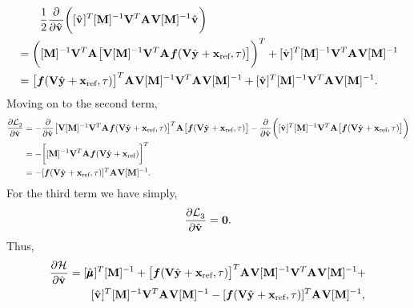 \documentclass[3p,computermodern,10pt]{elsarticle}
\begin{document}
\begin{appendices}
\begin{align*}
& \qquad \frac{1}{2} \frac{\partial }{\partial \hat{\mathbf{v}}^{}{}} \bigg( [\hat{\mathbf{v}}^{}]^T [\mathbf{M}]^{-1} \mathbf {V}^T \mathbf{A}^{} \mathbf {V} [\mathbf{M}]^{-1} \hat{\mathbf{v}}^{}\bigg) \\
&= \bigg(  [\mathbf{M}]^{-1} \mathbf {V}^T \mathbf{A}^{}  \big[ \mathbf {V}  [\mathbf{M}]^{-1}\mathbf {V}^T                      
\mathbf{A}^{}  \boldsymbol f(\mathbf {V} \hat{\mathbf{y}}^{} + \mathbf{x}_\text{ref},\tau) \big] \bigg)^T +   [\hat{\mathbf{v}}^{}]^T [\mathbf{M}]^{-1} \mathbf {V}^T \mathbf{A}^{} \mathbf {V} [\mathbf{M}]^{-1} \\
&= \big[ \boldsymbol f(\mathbf {V} \hat{\mathbf{y}}^{} + \mathbf{x}_\text{ref},\tau) \big]^T \mathbf{A}^{} \mathbf {V} [\mathbf{M}]^{-1}\mathbf {V}^T  \mathbf{A}^{} \mathbf {V} [\mathbf{M}]^{-1} +   [\hat{\mathbf{v}}^{}]^T [\mathbf{M}]^{-1} \mathbf {V}^T \mathbf{A}^{} \mathbf {V} [\mathbf{M}]^{-1}. 
\end{align*}
Moving on to the second term,
\begin{align*}
\frac{\partial  \mathcal{L}^{}_2 }{\partial \hat{\mathbf{v}}^{}{}} &= 
-\frac{\partial  }{\partial \hat{\mathbf{v}}^{}{}}   \big[ \mathbf {V}  [\mathbf{M}]^{-1}\mathbf {V}^T
\mathbf{A}^{}  \boldsymbol f(\mathbf {V} \hat{\mathbf{y}}^{} + \mathbf{x}_\text{ref},\tau) \big]^T \mathbf{A}^{} \big[ \boldsymbol f(\mathbf {V} \hat{\mathbf{y}}^{} + \mathbf{x}_\text{ref},\tau) \big]  - \frac{\partial  }{\partial \hat{\mathbf{v}}^{}{}} \bigg( [\hat{\mathbf{v}}^{}]^T[\mathbf{M}]^{-1} \mathbf {V}^T \mathbf{A}^{} \big[ \boldsymbol f(\mathbf {V} \hat{\mathbf{y}}^{} + \mathbf{x}_\text{ref},\tau) \big]  \bigg)  \\
&=- \bigg[ [\mathbf{M}]^{-1} \mathbf {V}^T \mathbf{A}^{} \boldsymbol f(\mathbf {V} \hat{\mathbf{y}} + \mathbf{x}_\text{ref}) \bigg]^T \\
&= - [\boldsymbol f(\mathbf {V} \hat{\mathbf{y}}^{} + \mathbf{x}_\text{ref},\tau) ]^T \mathbf{A}^{} \mathbf {V} [\mathbf{M}]^{-1}. 
\end{align*}
For the third term we have simply,
$$ \frac{\partial  \mathcal{L}^{}_3 }{\partial \hat{\mathbf{v}}^{}{}} = \boldsymbol 0 .$$
Thus,
\begin{align*}
\frac{\partial \hamiltonianArg{}}{\partial \controllerDiscreteDumArgnt{}} &= 
[\adjointDiscreteDumArgnt{}]^T[\massArgnt{}]^{-1}  +  \big[ \velocity(\veloargsromy) \big]^T \stweightingMatArg{} \basisspace [\massArgnt{}]^{-1}\basisspace^T  \stweightingMatArg{} \basisspace [\massArgnt{}]^{-1} + \\
& \qquad   [\controllerDiscreteDumArgnt{}]^T [\massArgnt{}]^{-1} \basisspace^T \stweightingMatArg{} \basisspace [\massArgnt{}]^{-1} - [\velocity(\veloargsromy) ]^T \stweightingMatArg{} \basisspace [\massArgnt{}]^{-1}, \\

\end{align*}
\end{appendices}
\end{document}
